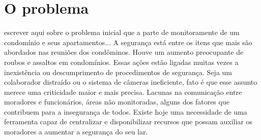\chapter{O problema}

escrever aqui sobre o problema inicial que a parte de monitoramente de um condomínio e seus apartamentos...
A segurança está entre os itens que mais são abordados nas reuniões dos condôminos. Houve um aumento preocupante de roubos e assaltos em condomínios. Essas ações estão ligadas muitas vezes a inexistência ou descumprimento de procedimentos de segurança. Seja um colaborador distraído ou o sistema de câmeras ineficiente, fato é que esse assunto merece uma criticidade maior e mais precisa.
Lacunas na comunicação entre moradores e funcionários, áreas não monitoradas, alguns dos fatores que contribuem para a insegurança de todos. Existe hoje uma necessidade de uma ferramenta capaz de centralizar e disponibilizar recursos que possam auxiliar os moradores a aumentar a segurança do seu lar. 
